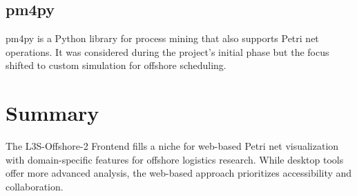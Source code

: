 \subsection{pm4py}

pm4py is a Python library for process mining that also supports Petri net operations. It was considered during the project's initial phase but the focus shifted to custom simulation for offshore scheduling.

\section{Summary}

The L3S-Offshore-2 Frontend fills a niche for web-based Petri net visualization with domain-specific features for offshore logistics research. While desktop tools offer more advanced analysis, the web-based approach prioritizes accessibility and collaboration.